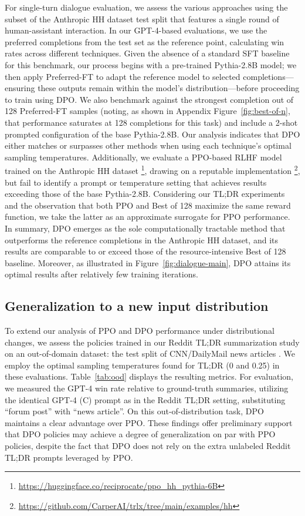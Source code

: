 For single-turn dialogue evaluation, we assess the various approaches using the subset of the Anthropic HH dataset \citep{bai2022training} test split that features a single round of human-assistant interaction. In our GPT-4-based evaluations, we use the preferred completions from the test set as the reference point, calculating win rates across different techniques. Given the absence of a standard SFT baseline for this benchmark, our process begins with a pre-trained Pythia-2.8B model; we then apply Preferred-FT to adapt the reference model to selected completions—ensuring these outputs remain within the model's distribution—before proceeding to train using DPO. We also benchmark against the strongest completion out of 128 Preferred-FT samples (noting, as shown in Appendix Figure~\ref{fig:best-of-n}, that performance saturates at 128 completions for this task) and include a 2-shot prompted configuration of the base Pythia-2.8B. Our analysis indicates that DPO either matches or surpasses other methods when using each technique’s optimal sampling temperatures. Additionally, we evaluate a PPO-based RLHF model trained on the Anthropic HH dataset \footnote{\url{https://huggingface.co/reciprocate/ppo_hh_pythia-6B}}, drawing on a reputable implementation \footnote{\url{https://github.com/CarperAI/trlx/tree/main/examples/hh}}, but fail to identify a prompt or temperature setting that achieves results exceeding those of the base Pythia-2.8B. Considering our TL;DR experiments and the observation that both PPO and Best of 128 maximize the same reward function, we take the latter as an approximate surrogate for PPO performance. In summary, DPO emerges as the sole computationally tractable method that outperforms the reference completions in the Anthropic HH dataset, and its results are comparable to or exceed those of the resource-intensive Best of 128 baseline. Moreover, as illustrated in Figure~\ref{fig:dialogue-main}, DPO attains its optimal results after relatively few training iterations.

\subsection{Generalization to a new input distribution}

To extend our analysis of PPO and DPO performance under distributional changes, we assess the policies trained in our Reddit TL;DR summarization study on an out-of-domain dataset: the test split of CNN/DailyMail news articles \citep{nallapati-etal-2016-abstractive}. We employ the optimal sampling temperatures found for TL;DR (0 and 0.25) in these evaluations. Table~\ref{tab:ood} displays the resulting metrics. For evaluation, we measured the GPT-4 win rate relative to ground-truth summaries, utilizing the identical GPT-4 (C) prompt as in the Reddit TL;DR setting, substituting ``forum post'' with ``news article''. On this out-of-distribution task, DPO maintains a clear advantage over PPO. These findings offer preliminary support that DPO policies may achieve a degree of generalization on par with PPO policies, despite the fact that DPO does not rely on the extra unlabeled Reddit TL;DR prompts leveraged by PPO.

